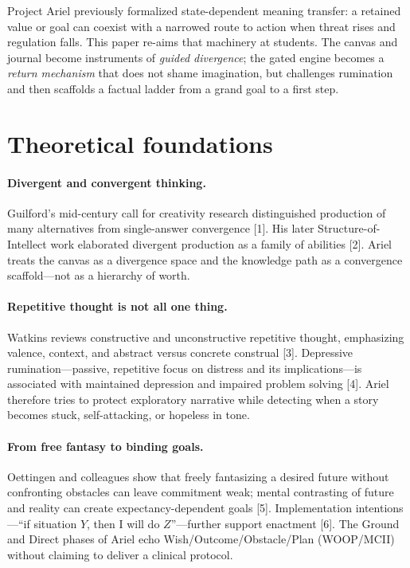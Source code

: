 \documentclass[11pt, a4paper]{article}
\begin{document}
Project Ariel previously formalized state-dependent meaning transfer: a retained value or goal can coexist with a narrowed route to action when threat rises and regulation falls. This paper re-aims that machinery at students. The canvas and journal become instruments of \emph{guided divergence}; the gated engine becomes a \emph{return mechanism} that does not shame imagination, but challenges rumination and then scaffolds a factual ladder from a grand goal to a first step.

\section{Theoretical foundations}
\paragraph{Divergent and convergent thinking.}
Guilford's mid-century call for creativity research distinguished production of many alternatives from single-answer convergence [1]. His later Structure-of-Intellect work elaborated divergent production as a family of abilities [2]. Ariel treats the canvas as a divergence space and the knowledge path as a convergence scaffold---not as a hierarchy of worth.

\paragraph{Repetitive thought is not all one thing.}
Watkins reviews constructive and unconstructive repetitive thought, emphasizing valence, context, and abstract versus concrete construal [3]. Depressive rumination---passive, repetitive focus on distress and its implications---is associated with maintained depression and impaired problem solving [4]. Ariel therefore tries to protect exploratory narrative while detecting when a story becomes stuck, self-attacking, or hopeless in tone.

\paragraph{From free fantasy to binding goals.}
Oettingen and colleagues show that freely fantasizing a desired future without confronting obstacles can leave commitment weak; mental contrasting of future and reality can create expectancy-dependent goals [5]. Implementation intentions---``if situation $Y$, then I will do $Z$''---further support enactment [6]. The Ground and Direct phases of Ariel echo Wish/Outcome/Obstacle/Plan (WOOP/MCII) without claiming to deliver a clinical protocol.
\end{document}
